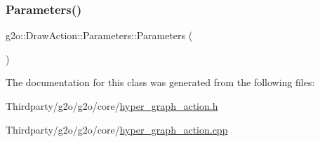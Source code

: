 \subsubsection{\texorpdfstring{Parameters()}{Parameters()}}
{\footnotesize\ttfamily g2o\+::\+Draw\+Action\+::\+Parameters\+::\+Parameters (\begin{DoxyParamCaption}{ }\end{DoxyParamCaption})}



The documentation for this class was generated from the following files\+:\begin{DoxyCompactItemize}
\item 
Thirdparty/g2o/g2o/core/\mbox{\hyperlink{hyper__graph__action_8h}{hyper\+\_\+graph\+\_\+action.\+h}}\item 
Thirdparty/g2o/g2o/core/\mbox{\hyperlink{hyper__graph__action_8cpp}{hyper\+\_\+graph\+\_\+action.\+cpp}}\end{DoxyCompactItemize}
